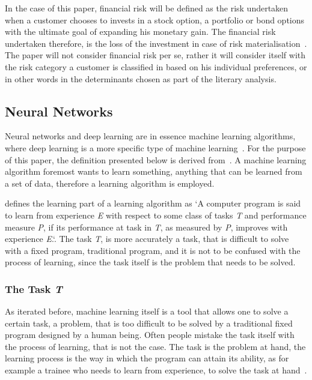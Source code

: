 \documentclass[12pt]{article}
\begin{document}
In the case of this paper, financial risk will be defined as the risk undertaken when a customer chooses to invests in a stock option, a portfolio or bond options with the ultimate goal of expanding his monetary gain. The financial risk undertaken therefore, is the loss of the investment in case of risk materialisation~\cite{finRisk}. The paper will not consider financial risk per se, rather it will consider itself with the risk category a customer is classified in based on his individual preferences, or in other words in the determinants chosen as part of the literary analysis.

\subsection{Neural Networks}
\label{sub:neural_networks}

Neural networks and deep learning are in essence machine learning algorithms, where deep learning is a more specific type of machine learning~\cite{deeplearningbook}. For the purpose of this paper, the definition presented below is derived from~\cite{deeplearningbook}. A machine learning algorithm foremost wants to learn something, anything that can be learned from a set of data, therefore a learning algorithm is employed.

\cite{mitchel97} defines the learning part of a learning algorithm as `A computer program is said to learn from experience \textit{E} with respect to some class of tasks \textit{T} and performance measure \textit{P}, if its performance at task in \textit{T}, as measured by \textit{P}, improves with experience \textit{E}.`. The task \textit{T}, is more accurately a task, that is difficult to solve with a fixed program, traditional program, and it is not to be confused with the process of learning, since the task itself is the problem that needs to be solved.


\subsubsection{The Task \textit{T}}
\label{subsub:task}
As iterated before, machine learning itself is a tool that allows one to solve a certain task, a problem, that is too difficult to be solved by a traditional fixed program designed by a human being.  Often people mistake the task itself with the process of learning, that is not the case. The task is the problem at hand, the learning process is the way in which the program can attain its ability, as for example a trainee who needs to learn from experience, to solve the task at hand~\cite{deeplearningbook}.
\end{document}
